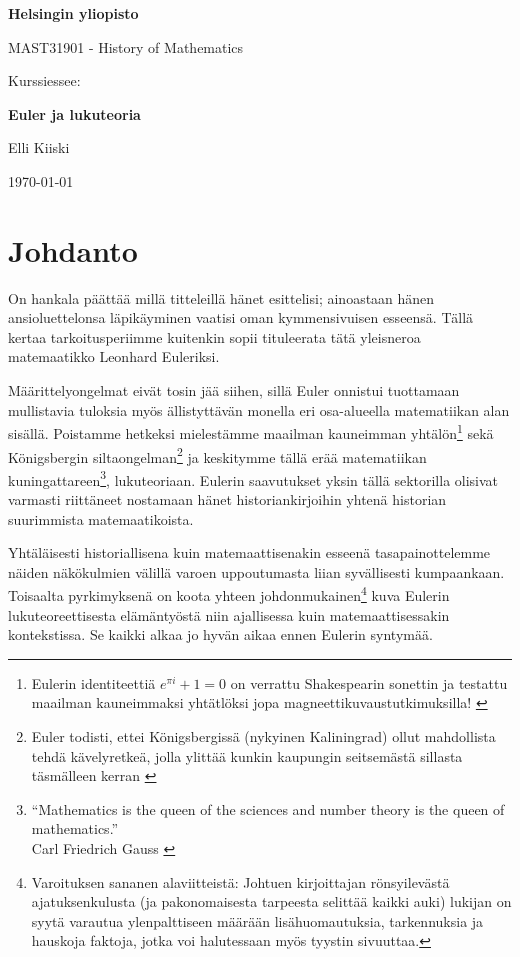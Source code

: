 \documentclass[a4paper,11pt]{article}
\begin{document}
{
\thispagestyle{empty}
{\large
\textbf{Helsingin yliopisto}
\par
MAST31901 - History of Mathematics
}

\vspace{7cm}

{\huge
Kurssiessee:}
\par
{\Large \bf Euler ja lukuteoria}

\vspace{2cm}

{\Large Elli Kiiski}

\vfill

{\large \today}
}

\clearpage


\section{Johdanto}

On hankala päättää millä titteleillä hänet esittelisi; ainoastaan hänen ansioluettelonsa läpikäyminen vaatisi oman kymmensivuisen esseensä. Tällä kertaa tarkoitusperiimme kuitenkin sopii tituleerata tätä yleisneroa matemaatikko Leonhard Euleriksi.

Määrittelyongelmat eivät tosin jää siihen, sillä Euler onnistui tuottamaan mullistavia tuloksia myös ällistyttävän monella eri osa-alueella matematiikan alan sisällä. Poistamme hetkeksi mielestämme maailman kauneimman yhtälön\footnote{Eulerin identiteettiä $e^{\pi i}+1=0$ on verrattu Shakespearin sonettin ja testattu maailman kauneimmaksi yhtätlöksi jopa magneettikuvaustutkimuksilla! \cite{identity}} sekä Königsbergin siltaongelman\footnote{Euler todisti, ettei Königsbergissä (nykyinen Kaliningrad) ollut mahdollista tehdä kävelyretkeä, jolla ylittää kunkin kaupungin seitsemästä sillasta täsmälleen kerran \cite{silta}} ja keskitymme tällä erää matematiikan kuningattareen\footnote{\enquote{Mathematics is the queen of the sciences and number theory is the queen of mathematics.}\\Carl Friedrich Gauss \cite{quotes}}, lukuteoriaan. Eulerin saavutukset yksin tällä sektorilla olisivat varmasti riittäneet nostamaan hänet historiankirjoihin yhtenä historian suurimmista matemaatikoista.

Yhtäläisesti historiallisena kuin matemaattisenakin esseenä tasapainottelemme näiden näkökulmien välillä varoen uppoutumasta liian syvällisesti kumpaankaan. Toisaalta pyrkimyksenä on koota yhteen johdonmukainen\footnote{Varoituksen sananen alaviitteistä: Johtuen kirjoittajan rönsyilevästä ajatuksenkulusta (ja pakonomaisesta tarpeesta selittää kaikki auki) lukijan on syytä varautua ylenpalttiseen määrään lisähuomautuksia, tarkennuksia ja hauskoja faktoja, jotka voi halutessaan myös tyystin sivuuttaa.} kuva Eulerin lukuteoreettisesta elämäntyöstä niin ajallisessa kuin matemaattisessakin kontekstissa. Se kaikki alkaa jo hyvän aikaa ennen Eulerin syntymää.
\end{document}
